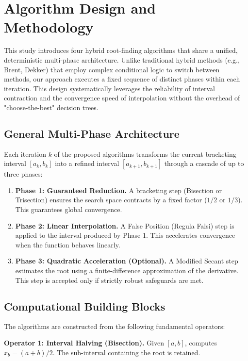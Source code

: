 \documentclass[amsmath, amssymb, aps]{revtex4-2}
\begin{document}
\section{Algorithm Design and Methodology}\label{sec:methodology}

This study introduces four hybrid root-finding algorithms that share a unified, deterministic multi-phase architecture. Unlike traditional hybrid methods (e.g., Brent, Dekker) that employ complex conditional logic to switch between methods, our approach executes a fixed sequence of distinct phases within each iteration. This design systematically leverages the reliability of interval contraction and the convergence speed of interpolation without the overhead of "choose-the-best" decision trees.

\subsection{General Multi-Phase Architecture}
Each iteration $k$ of the proposed algorithms transforms the current bracketing interval $[a_k, b_k]$ into a refined interval $[a_{k+1}, b_{k+1}]$ through a cascade of up to three phases:
\begin{enumerate}
    \item \textbf{Phase 1: Guaranteed Reduction.} A bracketing step (Bisection or Trisection) ensures the search space contracts by a fixed factor ($1/2$ or $1/3$). This guarantees global convergence.
    \item \textbf{Phase 2: Linear Interpolation.} A False Position (Regula Falsi) step is applied to the interval produced by Phase 1. This accelerates convergence when the function behaves linearly.
    \item \textbf{Phase 3: Quadratic Acceleration (Optional).} A Modified Secant step estimates the root using a finite-difference approximation of the derivative. This step is accepted only if strictly robust safeguards are met.
\end{enumerate}

\subsection{Computational Building Blocks}
The algorithms are constructed from the following fundamental operators:

\textbf{Operator 1: Interval Halving (Bisection).}
Given $[a, b]$, computes $x_{b} = (a+b)/2$. The sub-interval containing the root is retained.
\end{document}
